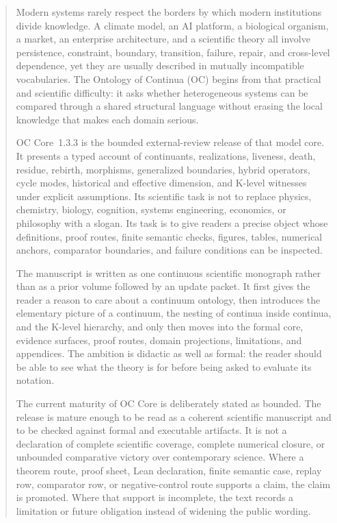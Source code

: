 \clearpage
\begin{abstract}
Modern systems rarely respect the borders by which modern institutions divide
knowledge. A climate model, an AI platform, a biological organism, a market, an
enterprise architecture, and a scientific theory all involve persistence,
constraint, boundary, transition, failure, repair, and cross-level dependence,
yet they are usually described in mutually incompatible vocabularies. The
Ontology of Continua (OC) begins from that practical and scientific difficulty:
it asks whether heterogeneous systems can be compared through a shared
structural language without erasing the local knowledge that makes each domain
serious.

OC Core~1.3.3 is the bounded external-review release of that model core. It
presents a typed account of continuants, realizations, liveness, death,
residue, rebirth, morphisms, generalized boundaries, hybrid operators, cycle
modes, historical and effective dimension, and K-level witnesses under explicit
assumptions. Its scientific task is not to replace physics, chemistry, biology,
cognition, systems engineering, economics, or philosophy with a slogan. Its
task is to give readers a precise object whose definitions, proof routes,
finite semantic checks, figures, tables, numerical anchors, comparator
boundaries, and failure conditions can be inspected.

The manuscript is written as one continuous scientific monograph rather than as
a prior volume followed by an update packet. It first gives the reader a reason
to care about a continuum ontology, then introduces the elementary picture of a
continuum, the nesting of continua inside continua, and the K-level hierarchy,
and only then moves into the formal core, evidence surfaces, proof routes,
domain projections, limitations, and appendices. The ambition is didactic as
well as formal: the reader should be able to see what the theory is for before
being asked to evaluate its notation.

The current maturity of OC Core is deliberately stated as bounded. The release
is mature enough to be read as a coherent scientific manuscript and to be
checked against formal and executable artifacts. It is not a declaration of
complete scientific coverage, complete numerical closure, or unbounded
comparative victory over contemporary science. Where a theorem route, proof
sheet, Lean declaration, finite semantic case, replay row, comparator row, or
negative-control route supports a claim, the claim is promoted. Where that
support is incomplete, the text records a limitation or future obligation
instead of widening the public wording.


\end{abstract}
